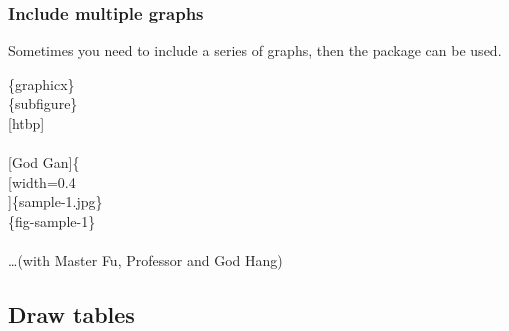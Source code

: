 \begin{frame}
	\frametitle{Include multiple graphs}
	Sometimes you need to include a series of graphs, then the  package can be used.\\
	\begin{minipage}{0.55\linewidth}
		\begin{example}
			\{graphicx\}\\
			\{subfigure\}\\
			[htbp]\\
			\qquad {}\\
			\qquad {}\{\\
			\qquad {}[width=0.4\\
			]\{sample-1.jpg\}\\
			\qquad\qquad {}\{fig-sample-1\}\\
			\qquad \\
			\qquad \dots(with Master Fu, Professor and God Hang)\\
		\end{example}
	\end{minipage}
	\hfill
	\begin{minipage}{0.4\linewidth}
	\end{minipage}
\end{frame}

\subsection{Draw tables}

